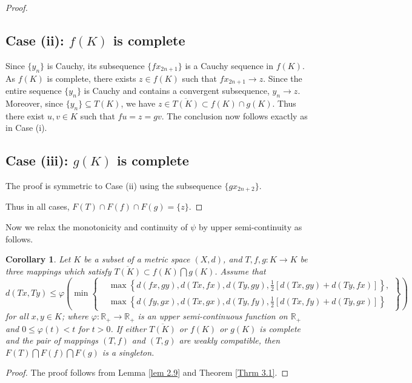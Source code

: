 \documentclass[a4paper,12pt,oneside]{article}
\newtheorem{corollary}[theorem]{Corollary}
\numberwithin{equation}{section}
\begin{document}
\begin{proof}
\subsection*{Case (ii): $f(K)$ is complete}
Since $\{y_n\}$ is Cauchy, its subsequence $\{fx_{2n+1}\}$ is a Cauchy sequence in $f(K)$. As $f(K)$ is complete, there exists $z \in f(K)$ such that $fx_{2n+1} \to z$. Since the entire sequence $\{y_n\}$ is Cauchy and contains a convergent subsequence, $y_n \to z$. Moreover, since $\{y_n\} \subseteq T(K)$, we have $z \in \overline{T(K)} \subset f(K) \cap g(K)$. Thus there exist $u,v \in K$ such that $fu = z = gv$. The conclusion now follows exactly as in Case (i).

\subsection*{Case (iii): $g(K)$ is complete}
The proof is symmetric to Case (ii) using the subsequence $\{gx_{2n+2}\}$.

Thus in all cases, $F(T) \cap F(f) \cap F(g) = \{z\}$.
\end{proof}

Now we relax the monotonicity and continuity of $\psi$ by upper semi-continuity as follows.

\begin{corollary}
Let $K$ be a subset of a metric space $(X,d)$, and $T, f, g: K \to K$ be three mappings which satisfy $\overline{T(K)} \subset f(K) \bigcap g(K)$. Assume that
\begin{equation}
d(Tx, Ty) \leq \varphi \left( \min \left\{ 
\begin{aligned}
&\max \left\{ d(fx, gy), d(Tx, fx), d(Ty, gy), \frac{1}{2}[d(Tx, gy) + d(Ty, fx)] \right\}, \\
&\max \left\{ d(fy, gx), d(Tx, gx), d(Ty, fy), \frac{1}{2}[d(Tx, fy) + d(Ty, gx)] \right\}
\end{aligned}
\right\} \right)
\end{equation}
for all $x, y \in K$; where $\varphi: \mathbb{R}_{+} \to \mathbb{R}_{+}$ is an upper semi-continuous function on $\mathbb{R}_{+}$ and $0 \leq \varphi(t) < t$ for $t > 0$. If either $\overline{T(K)}$ or $f(K)$ or $g(K)$ is complete and the pair of mappings $(T,f)$ and $(T,g)$ are weakly compatible, then $F(T) \bigcap F(f) \bigcap F(g)$ is a singleton.
\end{corollary}
\begin{proof}
    The proof follows from Lemma \eqref{lem 2.9} and Theorem \eqref{Thrm 3.1}.
\end{proof}
\end{document}
